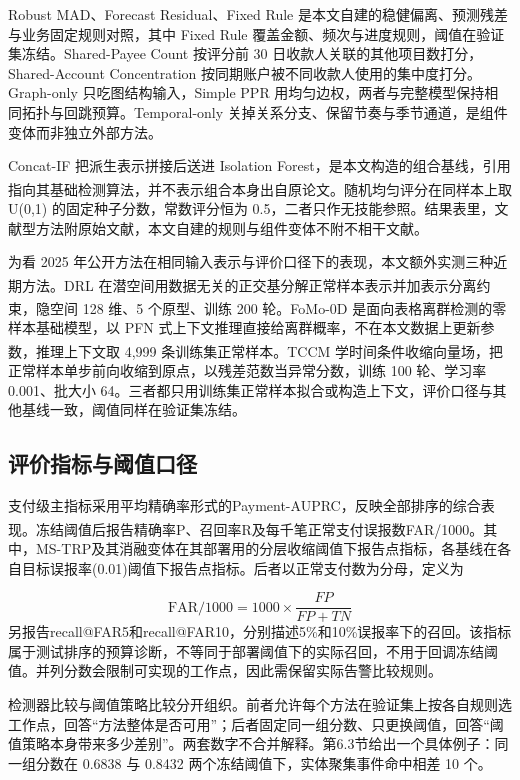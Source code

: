 \documentclass[twocolumn,11pt]{ctexart}
\newcommand{\upcite}[1]{\textsuperscript{\cite{#1}}}
\begin{document}
Robust MAD、Forecast Residual、Fixed Rule 是本文自建的稳健偏离、预测残差与业务固定规则对照，其中 Fixed Rule 覆盖金额、频次与进度规则，阈值在验证集冻结。Shared-Payee Count 按评分前 30 日收款人关联的其他项目数打分，Shared-Account Concentration 按同期账户被不同收款人使用的集中度打分。Graph-only 只吃图结构输入，Simple PPR 用均匀边权，两者与完整模型保持相同拓扑与回跳预算。Temporal-only 关掉关系分支、保留节奏与季节通道，是组件变体而非独立外部方法。

Concat-IF 把派生表示拼接后送进 Isolation Forest，是本文构造的组合基线，引用指向其基础检测算法\upcite{ref2}，并不表示组合本身出自原论文。随机均匀评分在同样本上取 U(0,1) 的固定种子分数，常数评分恒为 0.5，二者只作无技能参照。结果表里，文献型方法附原始文献，本文自建的规则与组件变体不附不相干文献。

为看 2025 年公开方法在相同输入表示与评价口径下的表现，本文额外实测三种近期方法。DRL\upcite{ref38} 在潜空间用数据无关的正交基分解正常样本表示并加表示分离约束，隐空间 128 维、5 个原型、训练 200 轮。FoMo-0D\upcite{ref39} 是面向表格离群检测的零样本基础模型，以 PFN 式上下文推理直接给离群概率，不在本文数据上更新参数，推理上下文取 4,999 条训练集正常样本。TCCM\upcite{ref40} 学时间条件收缩向量场，把正常样本单步前向收缩到原点，以残差范数当异常分数，训练 100 轮、学习率 0.001、批大小 64。三者都只用训练集正常样本拟合或构造上下文，评价口径与其他基线一致，阈值同样在验证集冻结。

\subsection{评价指标与阈值口径}
支付级主指标采用平均精确率形式的Payment-AUPRC，反映全部排序的综合表现\upcite{ref19}。冻结阈值后报告精确率P、召回率R及每千笔正常支付误报数FAR/1000。其中，MS-TRP及其消融变体在其部署用的分层收缩阈值下报告点指标，各基线在各自目标误报率(0.01)阈值下报告点指标。后者以正常支付数为分母，定义为

\begin{equation}
\mathrm{FAR}/1000 = 1000 \times \frac{FP}{FP + TN}
\end{equation}
另报告recall@FAR5和recall@FAR10，分别描述5\%和10\%误报率下的召回。该指标属于测试排序的预算诊断，不等同于部署阈值下的实际召回，不用于回调冻结阈值。并列分数会限制可实现的工作点，因此需保留实际告警比较规则。

检测器比较与阈值策略比较分开组织。前者允许每个方法在验证集上按各自规则选工作点，回答“方法整体是否可用”；后者固定同一组分数、只更换阈值，回答“阈值策略本身带来多少差别”。两套数字不合并解释。第6.3节给出一个具体例子：同一组分数在 0.6838 与 0.8432 两个冻结阈值下，实体聚集事件命中相差 10 个。
\end{document}
